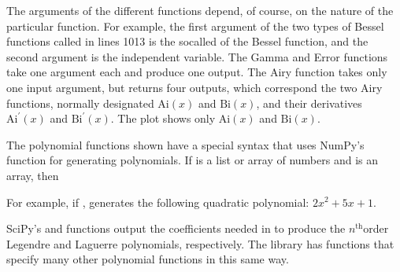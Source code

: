 \documentclass[letterpaper,10pt,english]{sphinxmanual}
\begin{document}
\sphinxAtStartPar
The arguments of the different functions depend, of course, on the nature of the particular function.  For example, the first argument of the two types of Bessel functions called in lines 10\sphinxhyphen{}13 is the so\sphinxhyphen{}called  of the  Bessel function, and the second argument is the independent variable.  The Gamma and Error functions take one argument each and produce one output.  The Airy function takes only one input argument, but returns four outputs, which correspond the two Airy functions, normally designated \(\mathrm{Ai}(x)\) and \(\mathrm{Bi}(x)\), and their derivatives \(\mathrm{Ai}^\prime(x)\) and \(\mathrm{Bi}^\prime(x)\).  The plot shows only \(\mathrm{Ai}(x)\) and \(\mathrm{Bi}(x)\).

\sphinxAtStartPar
The polynomial functions shown have a special syntax that uses NumPy’s  function for generating polynomials.  If  is a list or array of  numbers and  is an array, then

\begin{sphinxVerbatim}[commandchars=\\\{\}]
   \PYG{p}{[}\PYG{p}{]}  \PYG{p}{[}\PYG{p}{]}    \PYG{p}{[}\PYG{p}{]} 
                 \PYG{p}{[}\PYG{p}{]}
\end{sphinxVerbatim}

\sphinxAtStartPar
For example, if ,  generates the following quadratic polynomial: \(2x^2 + 5x +1\).

\sphinxAtStartPar
SciPy’s  and  functions output the coefficients  needed in  to produce the \(n^\mathrm{th}\)\sphinxhyphen{}order Legendre and Laguerre polynomials, respectively.  The  library has functions that specify many other polynomial functions in this same way.
\end{document}
